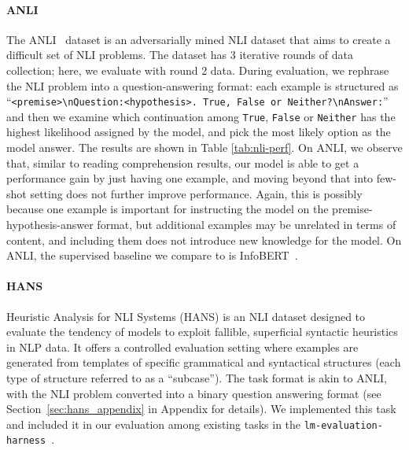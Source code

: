 \documentclass[11pt]{article}
\begin{document}
\paragraph{ANLI} The ANLI~\citep{Nie2020AdversarialNA} dataset is an adversarially mined NLI dataset that aims to create a difficult set of NLI problems. The dataset has 3 iterative rounds of data collection; here, we evaluate with round 2 data. During evaluation, we rephrase the NLI problem into a question-answering format: each example is structured as ``\texttt{<premise>\textbackslash nQuestion:<hypothesis>. True, False or Neither?\textbackslash nAnswer:}'' and then we examine which continuation among \texttt{True}, \texttt{False} or \texttt{Neither} has the highest likelihood assigned by the model, and pick the most likely option as the model answer. The results are shown in Table \ref{tab:nli-perf}. On ANLI, we observe that, similar to reading comprehension results, our model is able to get a performance gain by just having one example, and moving beyond that into few-shot setting does not further improve performance. Again, this is possibly because one example is important for instructing the model on the premise-hypothesis-answer format, but additional examples may be unrelated in terms of content, and including them does not introduce new knowledge for the model. On ANLI, the supervised baseline we compare to is InfoBERT~\cite{Wang2021InfoBERTIR}.

\paragraph{HANS} Heuristic Analysis for NLI Systems (HANS) \cite{hans} is an NLI dataset designed to evaluate the tendency of models to exploit fallible, superficial syntactic heuristics in NLP data. It offers a controlled evaluation setting where examples are generated from templates of specific grammatical and syntactical structures (each type of structure referred to as a ``subcase''). The task format is akin to ANLI, with the NLI problem converted into a binary question answering format (see Section~\ref{sec:hans_appendix} in Appendix for details). We implemented this task and included it in our evaluation among existing tasks in the \texttt{lm-evaluation-harness}~\citep{eval-harness}. %
\end{document}
